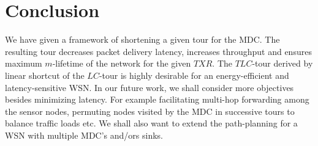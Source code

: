 \documentclass{llncs}
\begin{document}
\section{Conclusion}
We have given a framework of shortening a given tour for the MDC. The resulting tour decreases
packet delivery latency, increases throughput and ensures maximum $m$-lifetime of the network for
the given $TXR$. The $TLC$-tour derived by linear shortcut of the $LC$-tour is highly desirable for
an energy-efficient and latency-sensitive WSN. In our future work, we shall consider more
objectives besides
minimizing latency. For example facilitating multi-hop forwarding among the sensor nodes, 
permuting  nodes visited by the MDC in successive tours to balance traffic loads etc. We shall also
want to extend the path-planning for a WSN with multiple MDC's and/ors sinks.


\newpage
\end{document}
